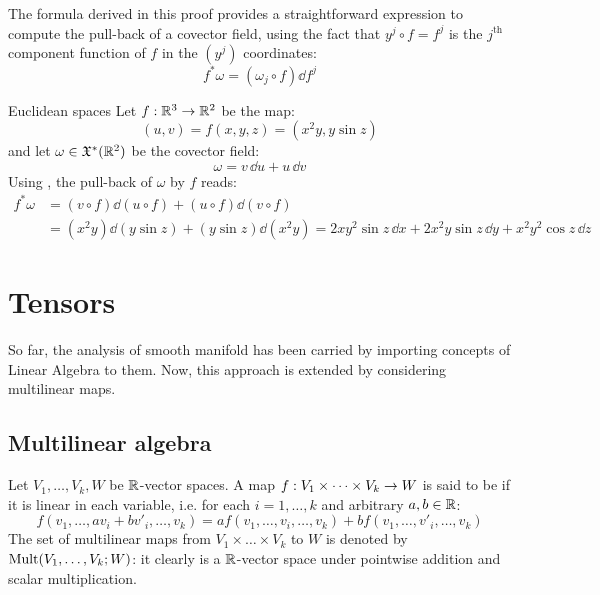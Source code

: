 The formula derived in this proof provides a straightforward expression to compute the pull-back of a covector field, using the fact that $ y^j \circ f = f^j $ is the $ j^\text{th} $ component function of $ f $ in the $ (y^j) $ coordinates:
\begin{equation}
  f^* \omega = (\omega_j \circ f) \dd f^j
  \label{eq:pull-back-simple}
\end{equation}

\begin{example}{Euclidean spaces}{}
  Let $ f : \mathbb{R}^3 \rightarrow \mathbb{R}^2 $ be the map:
  \begin{equation*}
    (u,v) = f(x,y,z) = (x^2y , y \sin z)
  \end{equation*}
  and let $ \omega \in \mathfrak{X}^*(\mathbb{R}^2) $ be the covector field:
  \begin{equation*}
    \omega = v \, \dd u + u \, \dd v
  \end{equation*}
  Using , the pull-back of $ \omega $ by $ f $ reads:
  \begin{equation*}
    \begin{split}
      f^*\omega
      & = (v \circ f) \dd (u \circ f) + (u \circ f) \dd (v \circ f) \\
      & = (x^2 y) \dd (y \sin z) + (y \sin z) \dd (x^2 y) = 2xy^2 \sin z \, \dd x + 2 x^2 y \sin z \, \dd y + x^2 y^2 \cos z \, \dd z
    \end{split}
  \end{equation*}
\end{example}

\section{Tensors}

So far, the analysis of smooth manifold has been carried by importing concepts of Linear Algebra to them. Now, this approach is extended by considering multilinear maps.

\subsection{Multilinear algebra}

Let $ V_1 , \dots , V_k , W $ be $ \mathbb{R} $-vector spaces. A map $ f : V_1 \times \dots \times V_k \rightarrow W $ is said to be  if it is linear in each variable, i.e. for each $ i = 1 , \dots , k $ and arbitrary $ a,b \in \mathbb{R} $:
\begin{equation*}
  f(v_1 , \dots , a v_i + b v'_i , \dots , v_k) = a f(v_1 , \dots , v_i , \dots , v_k) + b f(v_1 , \dots , v'_i , \dots , v_k)
\end{equation*}
The set of multilinear maps from $ V_1 \times \dots \times V_k $ to $ W $ is denoted by $ \operatorname{Mult}(V_1 , \dots , V_k ; W) $: it clearly is a $ \mathbb{R} $-vector space under pointwise addition and scalar multiplication.

